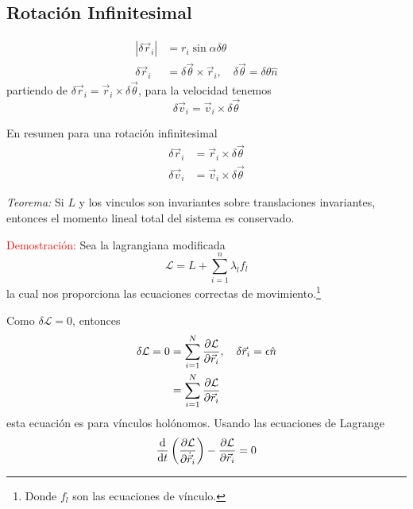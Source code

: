 \documentclass[../main]{subfiles}
\begin{document}
\subsection{Rotación Infinitesimal}

\begin{equation}
    \begin{split}
    |\delta \vec{r}_i|&=r_i \sin \alpha \delta \theta\\
    \delta \vec{r}_i&=\delta \vec{\theta} \times \vec{r}_i,\quad \delta \vec{\theta}=\delta\theta\hat{n}    
    \end{split}
\end{equation}
partiendo de $\delta \vec{r}_i=\vec{r}_i\times \delta \vec{\theta}$, para la velocidad tenemos
\begin{equation}
    \delta \vec{v}_i = \vec{v}_i \times \delta \vec{\theta}
\end{equation}

En resumen para una rotación infinitesimal
\begin{equation}
    \begin{split}
        \delta \vec{r}_i&=\vec{r}_i \times \delta \vec{\theta}\\
        \delta \vec{v}_i&=\vec{v}_i \times \delta \vec{\theta}
    \end{split}
\end{equation}

\textit{Teorema:} Si $L$ y los vinculos son invariantes sobre translaciones invariantes, entonces el momento lineal total del sistema es conservado.

\textcolor{red}{Demostración:} Sea la lagrangiana modificada
\begin{equation}
    \mathcal{L}=L+\sum_{i=1}^n \lambda_l f_l
\end{equation}
la cual nos proporciona las ecuaciones correctas de movimiento.\footnote{Donde $f_l$ son las ecuaciones de vínculo.} 

Como $\delta \mathcal{L}=0$, entonces
\begin{equation}
    \begin{split}
        \delta \mathcal{L}=0&=\sum_{i=1}^N \pdv{\mathcal{L}}{\vec{r}_i}(\delta \vec{r}_i),\quad \delta \vec{r}_i=\epsilon\hat{n}\\
        &=\sum_{i=1}^N \pdv{\mathcal{L}}{\vec{r}_i}(\epsilon\hat{n})
    \end{split}
\end{equation}
esta ecuación es para vínculos holónomos. Usando las ecuaciones de Lagrange
\begin{equation}
    \dv{}{t}\left(\pdv{\mathcal{L}}{\dot{\vec{r}}_i}\right)-\pdv{\mathcal{L}}{\vec{r}_i}=0
\end{equation}
\end{document}
